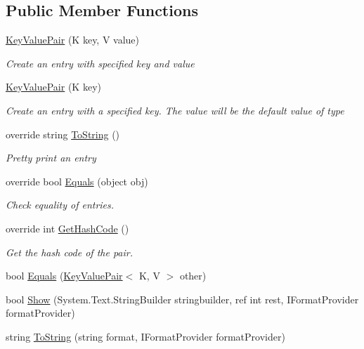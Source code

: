 \subsection*{Public Member Functions}
\begin{DoxyCompactItemize}
\item 
\hyperlink{struct_c5_1_1_key_value_pair_a2f037505ab6ee6564c47037dd07b5a47}{Key\+Value\+Pair} (K key, V value)
\begin{DoxyCompactList}\small\item\em Create an entry with specified key and value \end{DoxyCompactList}\item 
\hyperlink{struct_c5_1_1_key_value_pair_a5cb778bd5ae1640d7fffa68ed10c17f2}{Key\+Value\+Pair} (K key)
\begin{DoxyCompactList}\small\item\em Create an entry with a specified key. The value will be the default value of type \end{DoxyCompactList}\item 
override string \hyperlink{struct_c5_1_1_key_value_pair_abeb20e9a71adb3f6f449ee269ad5bbd2}{To\+String} ()
\begin{DoxyCompactList}\small\item\em Pretty print an entry \end{DoxyCompactList}\item 
override bool \hyperlink{struct_c5_1_1_key_value_pair_a8e9e659deebca34102ef67e838b8d527}{Equals} (object obj)
\begin{DoxyCompactList}\small\item\em Check equality of entries. \end{DoxyCompactList}\item 
override int \hyperlink{struct_c5_1_1_key_value_pair_a3c9e7fb6a992d358e1b3f9cfa0bde7f8}{Get\+Hash\+Code} ()
\begin{DoxyCompactList}\small\item\em Get the hash code of the pair. \end{DoxyCompactList}\item 
bool \hyperlink{struct_c5_1_1_key_value_pair_a31248ef30ff1adde1957773f137a6c8d}{Equals} (\hyperlink{struct_c5_1_1_key_value_pair}{Key\+Value\+Pair}$<$ K, V $>$ other)
\item 
bool \hyperlink{struct_c5_1_1_key_value_pair_aeee0d9e11280f6d298d9805da8f9d010}{Show} (System.\+Text.\+String\+Builder stringbuilder, ref int rest, I\+Format\+Provider format\+Provider)
\item 
string \hyperlink{struct_c5_1_1_key_value_pair_afc1822cdc3c4074de4c665cc521ac602}{To\+String} (string format, I\+Format\+Provider format\+Provider)
\end{DoxyCompactItemize}
